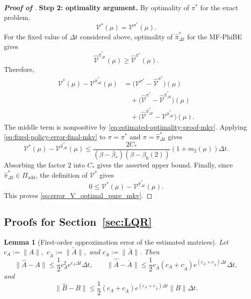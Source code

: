 \documentclass[a4paper, 10pt, english, reqno]{amsart}
\newtheorem{lemma}[theorem]{Lemma}
\begin{document}
\begin{proof}[\textbf{Proof of
}]
\noindent
\textbf{Step 2: optimality argument.}
By optimality of $\pi^*$ for the exact problem,
\[
\mathcal V^*(\mu)=\mathcal V^{\pi^*}(\mu).
\]
For the fixed value of $\Delta t$ considered above, optimality of
$\hat\pi_{\Delta t}^*$ for the MF-PhiBE gives
\begin{equation}
\label{eq:estimated-optimality-proof-mkv}
\hat{\mathcal V}^{\hat\pi_{\Delta t}^*}(\mu)
\ge
\hat{\mathcal V}^{\pi^*}(\mu).
\end{equation}
Therefore,
\[
\begin{aligned}
\mathcal V^*(\mu)
-\mathcal V^{\hat\pi_{\Delta t}^*}(\mu)
&=
\bigl(\mathcal V^{\pi^*}-\hat{\mathcal V}^{\pi^*}\bigr)(\mu)
\\
&\quad+
\bigl(
\hat{\mathcal V}^{\pi^*}
-\hat{\mathcal V}^{\hat\pi_{\Delta t}^*}
\bigr)(\mu)
\\
&\quad+
\bigl(
\hat{\mathcal V}^{\hat\pi_{\Delta t}^*}
-\mathcal V^{\hat\pi_{\Delta t}^*}
\bigr)(\mu).
\end{aligned}
\]
The middle term is nonpositive by
\eqref{eq:estimated-optimality-proof-mkv}. Applying
\eqref{eq:fixed-policy-error-final-mkv} to
$\pi=\pi^*$ and $\pi=\hat\pi_{\Delta t}^*$ gives
\[
\mathcal V^*(\mu)
-\mathcal V^{\hat\pi_{\Delta t}^*}(\mu)
\le
\frac{2C_*}{(\beta-\bar\beta_*)(\beta-\beta_0(2))}
(1+m_2(\mu))\Delta t.
\]
Absorbing the factor $2$ into $C_*$ gives the asserted upper bound.
Finally, since $\hat\pi_{\Delta t}^*\in\Pi_{\mathrm{add}}$, the
definition of $\mathcal V^*$ gives
\[
0
\le
\mathcal V^*(\mu)
-\mathcal V^{\hat\pi_{\Delta t}^*}(\mu).
\]
This proves \eqref{eq:error_V_optimal_pure_mkv}.
\end{proof}





\subsection{Proofs for Section~\ref{sec:LQR}}
\label{app:LQR-proofs}


\begin{lemma}[First-order approximation error of the estimated matrices]
\label{lem:first_order_coeff_error}
Let $c_A:=\|A\|,$ $c_{\tilde A}:=\|\tilde A\|,$ and $c_{\bar A}:=\|\bar A\|.$ Then
\[
    \|\hat A-A\|
    \le
    \frac12 c_A^2 e^{c_A\Delta t}\Delta t,\qquad 
    \|\hat{\bar A}-\bar A\|
    \le
    \frac12 c_{\bar A}(c_A+c_{\tilde A})
    e^{(c_A+c_{\tilde A})\Delta t}\Delta t,
\]
and
\[
    \|\hat B-B\|
    \le
    \frac12
    (c_A+c_{\bar A})e^{(c_A+c_{\tilde A})\Delta t}\|B\|\Delta t.
\]
\end{lemma}
\end{document}
